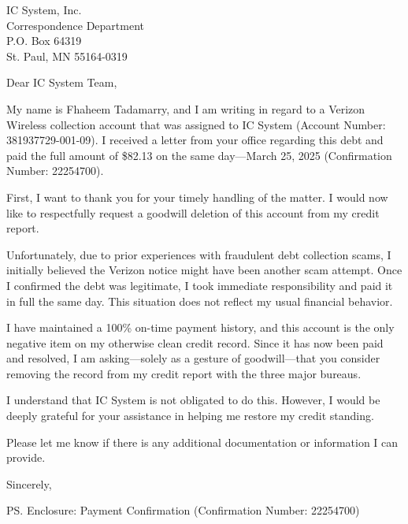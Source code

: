 \documentclass[12pt]{letter}
\begin{document}
\begin{letter}{
    IC System, Inc. \\
    Correspondence Department \\
    P.O. Box 64319 \\
    St. Paul, MN 55164-0319
}

\date{\today}
\signature{Fhaheem Tadamarry}

\opening{Dear IC System Team,}

My name is Fhaheem Tadamarry, and I am writing in regard to a Verizon Wireless collection account that was assigned to IC System (Account Number: 381937729-001-09). I received a letter from your office regarding this debt and paid the full amount of \$82.13 on the same day—March 25, 2025 (Confirmation Number: 22254700).

First, I want to thank you for your timely handling of the matter. I would now like to respectfully request a goodwill deletion of this account from my credit report.

Unfortunately, due to prior experiences with fraudulent debt collection scams, I initially believed the Verizon notice might have been another scam attempt. Once I confirmed the debt was legitimate, I took immediate responsibility and paid it in full the same day. This situation does not reflect my usual financial behavior.

I have maintained a 100\% on-time payment history, and this account is the only negative item on my otherwise clean credit record. Since it has now been paid and resolved, I am asking—solely as a gesture of goodwill—that you consider removing the record from my credit report with the three major bureaus.

I understand that IC System is not obligated to do this. However, I would be deeply grateful for your assistance in helping me restore my credit standing.

Please let me know if there is any additional documentation or information I can provide.

\closing{Sincerely,}

\ps{Enclosure: Payment Confirmation (Confirmation Number: 22254700)}

\end{letter}
\end{document}
